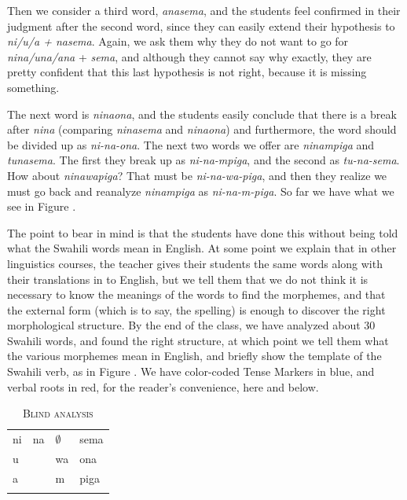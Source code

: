 \documentclass[output=paper,colorlinks,citecolor=brown]{langscibook}
\begin{document}
Then we consider a third word, \textit{anasema}, and the students feel confirmed in their judgment after the second word, since they can easily extend their hypothesis to \textit{ni/u/a + nasema}. Again, we ask them why they do not want to go for \textit{nina/una/ana} + \textit{sema}, and although they cannot say why exactly, they are pretty confident that this last hypothesis is not right, because it is missing something. 

The next word is \textit{ninaona}, and the students easily conclude that there is a break after \textit{nina} (comparing \textit{ninasema} and \textit{ninaona}) and furthermore, the word should be divided up as \textit{ni-na-ona}. The next two words we offer are \textit{ninampiga} and \textit{tunasema}. The first they break up as \textit{ni-na-mpiga}, and the second as \textit{tu-na-sema}. How about \textit{ninawapiga}? That must be \textit{ni-na-wa-piga}, and then they realize we must go back and reanalyze \textit{ninampiga} as \textit{ni-na-m-piga}. So far we have what we see in Figure .

The point to bear in mind is that the students have done this without being told what the Swahili words mean in English. At some point we explain that in other linguistics courses, the teacher gives their students the same words along with their translations in to English, but we tell them that we do not think it is necessary to know the meanings of the words to find the morphemes, and that the external form (which is to say, the spelling) is enough to discover the right morphological structure. By the end of the class, we have analyzed about 30 Swahili words, and found the right structure, at which point we tell them what the various morphemes mean in English, and briefly show the template of the Swahili verb, as in Figure . We have color-coded Tense Markers in blue, and verbal roots in red, for the reader's convenience, here and below. 



\begin{table}
\begin{tabular}{llll} \lsptoprule
ni & na & $\emptyset$ & sema \\
u &     & wa & ona \\
a &     & m  & piga \\ \lspbottomrule
\end{tabular}
\caption{\textsc{Blind analysis}}
\label{blind-analysis}
\end{table}
\end{document}
